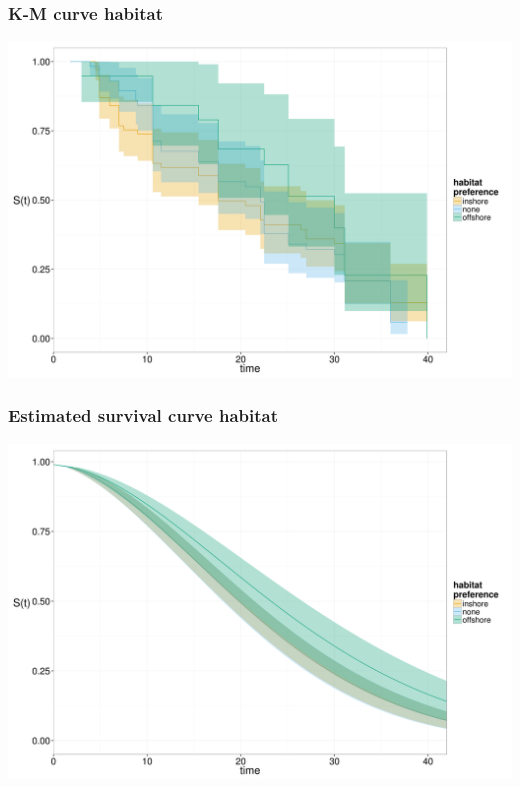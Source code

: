 \documentclass{beamer}
\begin{document}
\begin{frame}
  \frametitle{K-M curve habitat}
  \begin{center}
    \includegraphics[height = 0.8\textheight, width = \textwidth, keepaspectratio = true]{figure/km_hab}
  \end{center}
\end{frame}

\begin{frame}
  \frametitle{Estimated survival curve habitat}
  \begin{center}
    \includegraphics[height = 0.8\textheight, width = \textwidth, keepaspectratio = true]{figure/hab}
  \end{center}
\end{frame}
\end{document}
